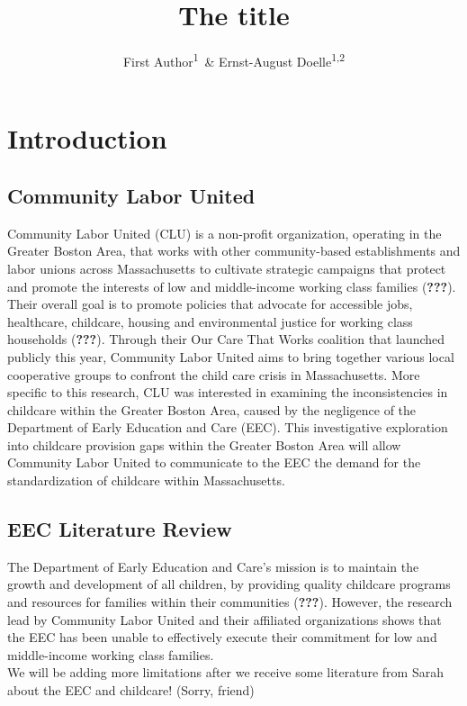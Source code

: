 \documentclass[man]{apa6}
\title{The title}
\author{First Author\textsuperscript{1}~\& Ernst-August
Doelle\textsuperscript{1,2}}
\date{}
\affiliation{
\vspace{0.5cm}
\textsuperscript{1} Wilhelm-Wundt-University\\\textsuperscript{2} Konstanz Business School}
\begin{document}
\maketitle

\section{Introduction}\label{introduction}

\subsection{Community Labor United}\label{community-labor-united}

Community Labor United (CLU) is a non-profit organization, operating in
the Greater Boston Area, that works with other community-based
establishments and labor unions across Massachusetts to cultivate
strategic campaigns that protect and promote the interests of low and
middle-income working class families ({\textbf{???}}). Their overall
goal is to promote policies that advocate for accessible jobs,
healthcare, childcare, housing and environmental justice for working
class households ({\textbf{???}}). Through their Our Care That Works
coalition that launched publicly this year, Community Labor United aims
to bring together various local cooperative groups to confront the child
care crisis in Massachusetts. More specific to this research, CLU was
interested in examining the inconsistencies in childcare within the
Greater Boston Area, caused by the negligence of the Department of Early
Education and Care (EEC). This investigative exploration into childcare
provision gaps within the Greater Boston Area will allow Community Labor
United to communicate to the EEC the demand for the standardization of
childcare within Massachusetts.

\subsection{EEC Literature Review}\label{eec-literature-review}

The Department of Early Education and Care's mission is to maintain the
growth and development of all children, by providing quality childcare
programs and resources for families within their communities
({\textbf{???}}). However, the research lead by Community Labor United
and their affiliated organizations shows that the EEC has been unable to
effectively execute their commitment for low and middle-income working
class families.\\
We will be adding more limitations after we receive some literature from
Sarah about the EEC and childcare! (Sorry, friend)
\end{document}
